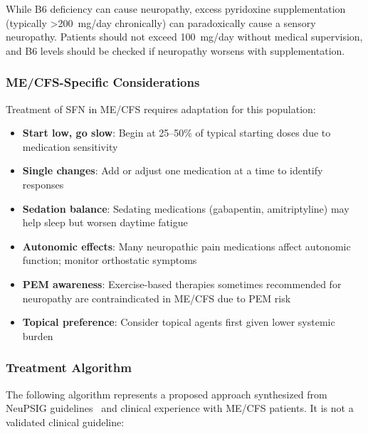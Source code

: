 \begin{warning}
While B6 deficiency can cause neuropathy, excess pyridoxine supplementation (typically >200~mg/day chronically) can paradoxically cause a sensory neuropathy. Patients should not exceed 100~mg/day without medical supervision, and B6 levels should be checked if neuropathy worsens with supplementation.
\end{warning}

\subsubsection{ME/CFS-Specific Considerations}

Treatment of SFN in ME/CFS requires adaptation for this population:

\begin{itemize}
    \item \textbf{Start low, go slow}: Begin at 25--50\% of typical starting doses due to medication sensitivity
    \item \textbf{Single changes}: Add or adjust one medication at a time to identify responses
    \item \textbf{Sedation balance}: Sedating medications (gabapentin, amitriptyline) may help sleep but worsen daytime fatigue
    \item \textbf{Autonomic effects}: Many neuropathic pain medications affect autonomic function; monitor orthostatic symptoms
    \item \textbf{PEM awareness}: Exercise-based therapies sometimes recommended for neuropathy are contraindicated in ME/CFS due to PEM risk
    \item \textbf{Topical preference}: Consider topical agents first given lower systemic burden
\end{itemize}

\subsubsection{Treatment Algorithm}

The following algorithm represents a proposed approach synthesized from NeuPSIG guidelines~\cite{Finnerup2015neuropathic} and clinical experience with ME/CFS patients. It is not a validated clinical guideline:

